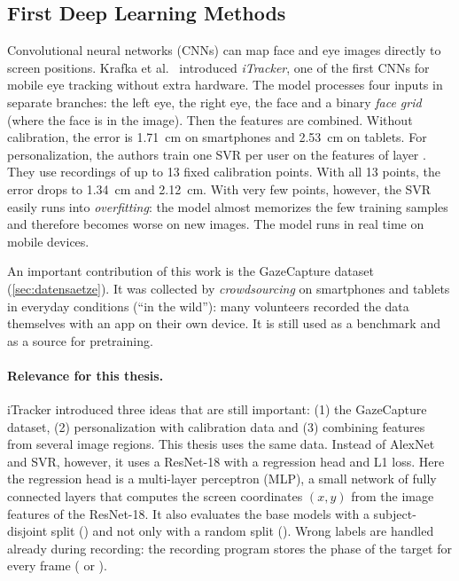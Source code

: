\subsection{First Deep Learning Methods}
\label{subsec:dl_pioniere}
Convolutional neural networks (CNNs) can map face and eye images directly to
screen positions. Krafka et al.~\cite{krafka2016itracker} introduced
\emph{iTracker}, one of the first CNNs for mobile eye tracking without extra
hardware. The model processes four inputs in separate branches: the left eye,
the right eye, the face and a binary \emph{face grid} (where the face is in the
image). Then the features are combined. Without calibration, the error is
\SI{1.71}{\centi\metre} on smartphones and \SI{2.53}{\centi\metre} on tablets.
For personalization, the authors train one SVR per user on the features of
layer . They use recordings of up to 13 fixed calibration points.
With all 13 points, the error drops to \SI{1.34}{\centi\metre} and
\SI{2.12}{\centi\metre}. With very few points, however, the SVR easily runs into
\emph{overfitting}: the model almost memorizes the few training samples and
therefore becomes worse on new images. The model runs in real time on mobile devices.

An important contribution of this work is the GazeCapture dataset
(\cref{sec:datensaetze}). It was collected by \emph{crowdsourcing} on smartphones and
tablets in everyday conditions (\enquote{in the wild}): many volunteers
recorded the data themselves with an app on their own device. It is still used as a
benchmark and as a source for pretraining.

\paragraph{Relevance for this thesis.}
iTracker introduced three ideas that are still important: (1) the GazeCapture
dataset, (2) personalization with calibration data and (3) combining features
from several image regions. This thesis uses the same data. Instead of AlexNet
and SVR, however, it uses a ResNet-18 \cite{he2016resnet} with a
regression head and L1 loss. Here the regression head is a multi-layer
perceptron (MLP), a small network of fully connected layers that computes the screen
coordinates $(x, y)$ from the image features of the ResNet-18. It also evaluates the base models with a
subject-disjoint split () and not only with a random
split (). Wrong labels are handled already during recording: the
recording program stores the phase of the target for every frame
( or ).

